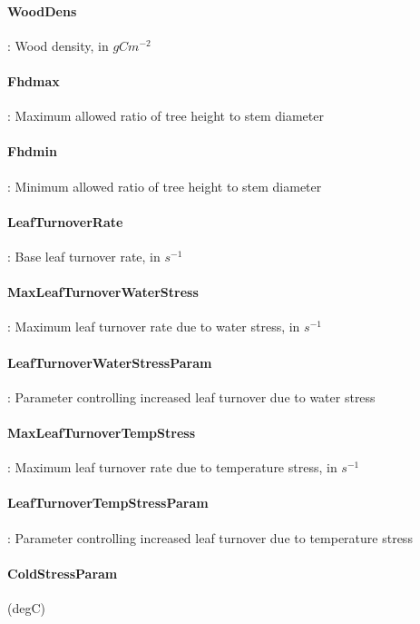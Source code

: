 \paragraph{WoodDens}: Wood density, in $gCm^{-2}$

\hangindent=0.7cm
\paragraph{Fhdmax}: Maximum allowed ratio of tree height to stem diameter 

\hangindent=0.7cm
\paragraph{Fhdmin}: Minimum allowed ratio of tree height to stem diameter 

\hangindent=0.7cm
\paragraph{LeafTurnoverRate}: Base leaf turnover rate, in $s^{-1}$ 

\hangindent=0.7cm
\paragraph{MaxLeafTurnoverWaterStress}: Maximum leaf turnover rate due to water stress, in $s^{-1}$  

\hangindent=0.7cm
\paragraph{LeafTurnoverWaterStressParam}: Parameter controlling increased leaf turnover due to water stress 

\hangindent=0.7cm
\paragraph{MaxLeafTurnoverTempStress}: Maximum leaf turnover rate due to temperature stress, in $s^{-1}$   

\hangindent=0.7cm
\paragraph{LeafTurnoverTempStressParam}: Parameter controlling increased leaf turnover due to temperature stress 

\hangindent=0.7cm
\paragraph{ColdStressParam}   (degC)

